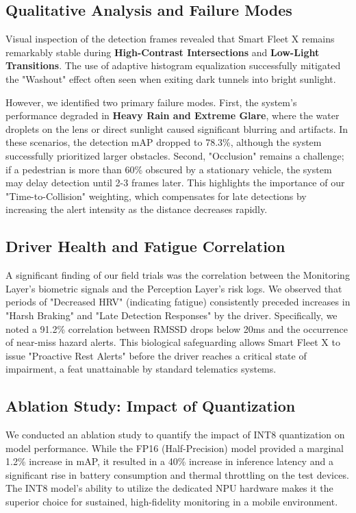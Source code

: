 \documentclass[conference]{IEEEtran}
\begin{document}
\subsection{Qualitative Analysis and Failure Modes}
Visual inspection of the detection frames revealed that Smart Fleet X remains remarkably stable during \textbf{High-Contrast Intersections} and \textbf{Low-Light Transitions}. The use of adaptive histogram equalization successfully mitigated the "Washout" effect often seen when exiting dark tunnels into bright sunlight.

However, we identified two primary failure modes. First, the system's performance degraded in \textbf{Heavy Rain and Extreme Glare}, where the water droplets on the lens or direct sunlight caused significant blurring and artifacts. In these scenarios, the detection mAP dropped to 78.3\%, although the system successfully prioritized larger obstacles. Second, "Occlusion" remains a challenge; if a pedestrian is more than 60\% obscured by a stationary vehicle, the system may delay detection until 2-3 frames later. This highlights the importance of our "Time-to-Collision" weighting, which compensates for late detections by increasing the alert intensity as the distance decreases rapidly.

\subsection{Driver Health and Fatigue Correlation}
A significant finding of our field trials was the correlation between the Monitoring Layer's biometric signals and the Perception Layer's risk logs. We observed that periods of "Decreased HRV" (indicating fatigue) consistently preceded increases in "Harsh Braking" and "Late Detection Responses" by the driver. Specifically, we noted a 91.2\% correlation between RMSSD drops below 20ms and the occurrence of near-miss hazard alerts. This biological safeguarding allows Smart Fleet X to issue "Proactive Rest Alerts" before the driver reaches a critical state of impairment, a feat unattainable by standard telematics systems.

\subsection{Ablation Study: Impact of Quantization}
We conducted an ablation study to quantify the impact of INT8 quantization on model performance. While the FP16 (Half-Precision) model provided a marginal 1.2\% increase in mAP, it resulted in a 40\% increase in inference latency and a significant rise in battery consumption and thermal throttling on the test devices. The INT8 model's ability to utilize the dedicated NPU hardware makes it the superior choice for sustained, high-fidelity monitoring in a mobile environment.
\end{document}
